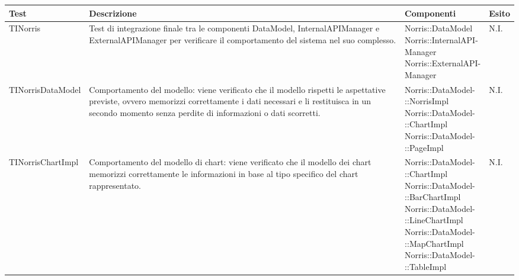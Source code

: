 
\begin{longtabu}{| X | X | X[0.9] | X[0.3] |}

			\hline
			\rowfont{\bf}
			Test &
			Descrizione &
			Componenti &
			Esito \\
			\hline \endhead




	TINorris
	&
Test di integrazione finale tra le componenti DataModel, InternalAPIManager e ExternalAPIManager per verificare il comportamento del sistema nel suo complesso.
& \parbox[t]{0.6\textwidth}{
Norris::DataModel\\
Norris::InternalAPI-\\Manager\\
Norris::ExternalAPI-\\Manager}
			& N.I.
			\\ \hline



	TINorrisDataModel
	&
Comportamento del modello: viene verificato che il modello rispetti le aspettative previste, ovvero memorizzi correttamente i dati necessari e li restituisca in un secondo momento senza perdite di informazioni o dati scorretti.
& \parbox[t]{0.6\textwidth}{
Norris::DataModel-\\::NorrisImpl\\
Norris::DataModel-\\::ChartImpl\\
Norris::DataModel-\\::PageImpl}
			& N.I.
			\\ \hline



	TINorrisChartImpl
	&
Comportamento del modello di chart: viene verificato che il modello dei chart memorizzi correttamente le informazioni in base al tipo specifico del chart rappresentato.
& \parbox[t]{0.6\textwidth}{
Norris::DataModel-\\::ChartImpl\\
Norris::DataModel-\\::BarChartImpl\\
Norris::DataModel-\\::LineChartImpl\\
Norris::DataModel-\\::MapChartImpl\\
Norris::DataModel-\\::TableImpl}
			& N.I.
			\\ \hline




\end{longtabu}
